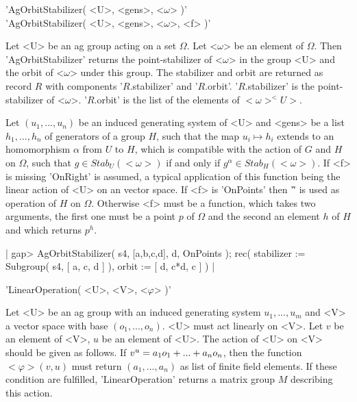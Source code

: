 
'AgOrbitStabilizer( <U>, <gens>, <$\omega$> )'\\
'AgOrbitStabilizer( <U>, <gens>, <$\omega$>, <f> )'

Let <U> be an ag group acting  on a set  $\Omega$.  Let <$\omega$>  be an
element   of     $\Omega$.    Then    'AgOrbitStabilizer'  returns    the
point-stabilizer  of <$\omega$>  in  the group <U>  and  the   orbit   of
<$\omega$> under  this group.  The stabilizer and  orbit are  returned as
record     $R$ with   components    '$R$.stabilizer'  and    '$R$.orbit'.
'$R$.stabilizer' is  the point-stabilizer of  <$\omega$>.  '$R$.orbit' is
the list of the elements of $<\omega> ^ <U>$.

Let $(u_1, ..., u_n)$ be  an  induced generating system of <U> and <gens>
be a list $h_1, ..., h_n$ of generators of a group $H$, such that the map
$u_i\mapsto h_i$ extends to an  homomorphism  $\alpha$  from $U$  to $H$,
which is compatible with the action of $G$ and $H$ on $\Omega$, such that
$g\in Stab_U( <\omega> )$ if and  only if  $g^\alpha\in Stab_H(  <\omega>
)$.   If <f> is  missing 'OnRight' is assumed, a  typical application  of
this function being the linear  action of <U> on an vector space.  If <f>
is  'OnPoints'  then  '\^' is  used  as  operation  of  $H$ on  $\Omega$.
Otherwise  <f> must  be a function, which takes two  arguments, the first
one must be a  point $p$ of $\Omega$ and the second an element $h$ of $H$
and which returns $p ^ h$.

|    gap> AgOrbitStabilizer( s4, [a,b,c,d], d, OnPoints );
    rec(
      stabilizer := Subgroup( s4, [ a, c, d ] ),
      orbit := [ d, c*d, c ] ) |


'LinearOperation( <U>, <V>, <$\varphi$> )'

Let <U> be an ag group with an induced generating  system $u_1, ..., u_m$
and <V> a vector space with base $(o_1, ..., o_n)$. <U> must act linearly
on <V>.  Let $v$ be an element  of <V>, $u$  be  an element of  <U>.  The
action of <U> on <V> should be given as follows.  If $v^u = a_1\*o_1+ ...
+a_n\*o_n$, then the function $<\varphi>( v, u )$ must return $(a_1, ...,
a_n)$  as list of    finite  field  elements.   If these   condition  are
fulfilled, 'LinearOperation' returns  a matrix group  $M$ describing this
action.

